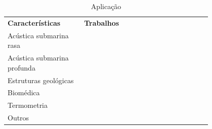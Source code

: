 \begin{table}[H]
	\def\seleccite{\bfseries}
	\centering
	\caption{Aplicação}
	\label{table:cp_classif_aplicacao}
	\begin{tabular}{C{0.3\linewidth} C{0.5\linewidth}}
		\textbf{Características} & \textbf{Trabalhos} \\
		\ttline
		Acústica submarina rasa & 
		\cite{abakumov_timelapse_2019}
		\cite{amini_joint_2016}
		\cite{deluca_simultaneous_2022}
		\cite{dosso_joint_2023}
		\cite{hou_velocity_2018}
		\cite{mallick_prediction_2022}
		\cite{radhakrishnan_inversion_2024}
		\cite{taroudakis_tomographic_2001}
		\cite{voort_inversion_2022}
		\cite{wu_inversion_2023}
		\cite{zhang_inversion_2016}
		\\\tline
		Acústica submarina profunda &
		\cite{agata_bayesian_2023}
		\cite{amini_joint_2016}
		\cite{datta_fast_2019}
		\cite{ritter_water_2010}
		\cite{takeuchi_development_1993}
		\cite{vadapalli_application_2012}
		\\\tline
		Estruturas geológicas & 
		\cite{agata_bayesian_2023}
		\cite{djikpesse_reducing_2010}
		\cite{gras_practical_2022}
		\cite{han_realtime_2014}
		\cite{jo_seismic_2023}
		\cite{jo_seismic_2024}
		\cite{li_multiscale_2024}
		\cite{mei_uncertainty_2025}
		\cite{shin_distributed_2022}
		\cite{wang_seismic_2024}
		\cite{wo_firstarrival_2024}
		\cite{becker_geoacoustic_2007}
		\cite{chapeland_highresolution_2022}
		\cite{hou_velocity_2018}
		\cite{lin_equivalent_2006}
		\cite{mcmechan_application_1982}
		\cite{michalopoulou_environmental_2018}
		\cite{wellington_2d_2015}
		\cite{wong_leastsquares_2011}
		\\\tline
		Biomédica &
		\cite{goyal_ultrasound_2025}
		\\\tline
		Termometria &
		\cite{bao_online_2020}
		\cite{carriere_featureoriented_2013}
		\cite{othmani_acoustic_2024}
		\cite{yu_krylov_2021}
		\cite{zhang_nonlinear_2022}
		\\\tline
		Outros &
		\cite{zhang_optimization_2023}
		\cite{mitchell_optical_2018}
	\end{tabular}
\end{table}

